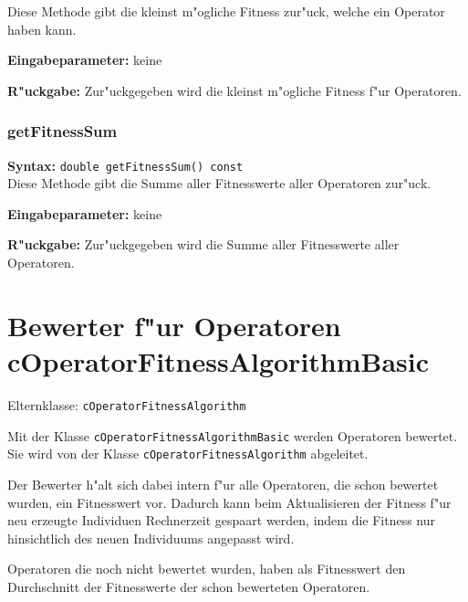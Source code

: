 Diese Methode gibt die kleinst m"ogliche Fitness zur"uck, welche ein Operator haben kann.

\bigskip\noindent
\textbf{Eingabeparameter:} keine

\bigskip\noindent
\textbf{R"uckgabe:} Zur"uckgegeben wird die kleinst m"ogliche Fitness f"ur Operatoren.


\subsubsection{getFitnessSum}

\textbf{Syntax:} \verb|double getFitnessSum() const| \\

Diese Methode gibt die Summe aller Fitnesswerte aller Operatoren zur"uck.

\bigskip\noindent
\textbf{Eingabeparameter:} keine

\bigskip\noindent
\textbf{R"uckgabe:} Zur"uckgegeben wird die Summe aller Fitnesswerte aller Operatoren.


\section{Bewerter f"ur Operatoren cOperatorFitnessAlgorithmBasic}
\label{secCOperationFitnessAlgorithmusBasic}

Elternklasse: \verb|cOperatorFitnessAlgorithm|

\bigskip\noindent
Mit der Klasse \verb|cOperatorFitnessAlgorithmBasic| werden Operatoren bewertet. Sie wird von der Klasse \verb|cOperatorFitnessAlgorithm| abgeleitet.

Der Bewerter h"alt sich dabei intern f"ur alle Operatoren, die schon bewertet wurden, ein Fitnesswert vor. Dadurch kann beim Aktualisieren der Fitness f"ur neu erzeugte Individuen Rechnerzeit gespaart werden, indem die Fitness nur hinsichtlich des neuen Individuums angepasst wird.

Operatoren die noch nicht bewertet wurden, haben als Fitnesswert den Durchschnitt der Fitnesswerte der schon bewerteten Operatoren.

